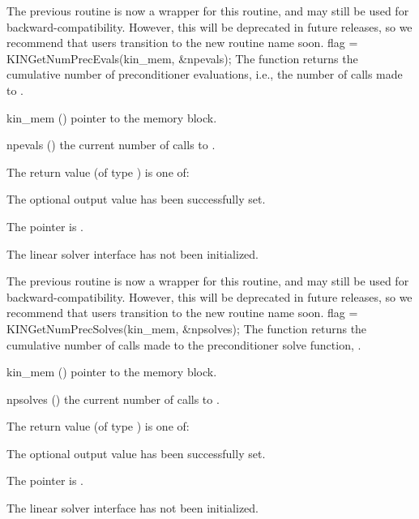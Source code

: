 {
  The previous routine  is now a wrapper for
  this routine, and may still be used for backward-compatibility.
  However, this will be deprecated in future releases, so we recommend
  that users transition to the new routine name soon.
}
{
  flag = KINGetNumPrecEvals(kin\_mem, \&npevals);
}
{
  The function  returns the cumulative number
  of preconditioner evaluations, i.e., the number of calls made to
  .
}
{
  \begin{args}
  \item[kin\_mem] ()
    pointer to the {\kinsol} memory block.
  \item[npevals] ()
    the current number of calls to .
  \end{args}
}
{
  The return value  (of type ) is one of:
  \begin{args}
  \item[\Id{KINLS\_SUCCESS}]
    The optional output value has been successfully set.
  \item[\Id{KINLS\_MEM\_NULL}]
    The  pointer is .
  \item[\Id{KINLS\_LMEM\_NULL}]
    The {\kinls} linear solver interface has not been initialized.
  \end{args}
}
{
  The previous routine  is now a wrapper for
  this routine, and may still be used for backward-compatibility.
  However, this will be deprecated in future releases, so we recommend
  that users transition to the new routine name soon.
}
{
  flag = KINGetNumPrecSolves(kin\_mem, \&npsolves);
}
{
  The function  returns the
  cumulative number of calls made to the preconditioner
  solve function, .
}
{
  \begin{args}
  \item[kin\_mem] ()
    pointer to the {\kinsol} memory block.
  \item[npsolves] ()
    the current number of calls to .
  \end{args}
}
{
  The return value  (of type ) is one of:
  \begin{args}
  \item[\Id{KINLS\_SUCCESS}]
    The optional output value has been successfully set.
  \item[\Id{KINLS\_MEM\_NULL}]
    The  pointer is .
  \item[\Id{KINLS\_LMEM\_NULL}]
    The {\kinls} linear solver interface has not been initialized.
  \end{args}
}
